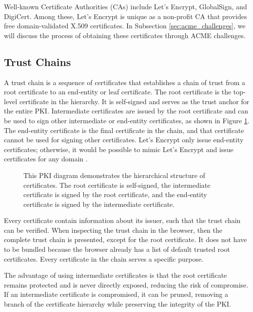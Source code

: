 Well-known Certificate Authorities (CAs) include Let's Encrypt, GlobalSign, and DigiCert. Among these, Let's Encrypt is unique as a non-profit CA that provides free domain-validated X.509 certificates. In Subsection \ref{sec:acme_challenges}, we will discuss the process of obtaining these certificates through ACME challenges.

\subsection{Trust Chains} \label{sec:trust_chains}
A trust chain is a sequence of certificates that establishes a chain of trust from a root certificate to an end-entity or leaf certificate. The root certificate is the top-level certificate in the hierarchy. It is self-signed and serves as the trust anchor for the entire PKI. Intermediate certificates are issued by the root certificate and can be used to sign other intermediate or end-entity certificates, as shown in Figure \ref{fig:pki_diagram}. The end-entity certificate is the final certificate in the chain, and that certificate cannot be used for signing other certificates. Let's Encrypt only issue end-entity certificates; otherwise, it would be possible to mimic Let's Encrypt and issue certificates for any domain \cite{letsencrypt_certificates}.

\begin{figure}[h]
    \centering
    
    \caption{This PKI diagram demonstrates the hierarchical structure of certificates. The root certificate is self-signed, the intermediate certificate is signed by the root certificate, and the end-entity certificate is signed by the intermediate certificate.}
    \label{fig:pki_diagram}
\end{figure}

Every certificate contain information about its issuer, such that the trust chain can be verified. When inspecting the trust chain in the browser, then the complete trust chain is presented, except for the root certificate. It does not have to be bundled because the browser already has a list of default trusted root certificates. Every certificate in the chain serves a specific purpose.

The advantage of using intermediate certificates is that the root certificate remains protected and is never directly exposed, reducing the risk of compromise. If an intermediate certificate is compromised, it can be pruned, removing a branch of the certificate hierarchy while preserving the integrity of the PKI.

